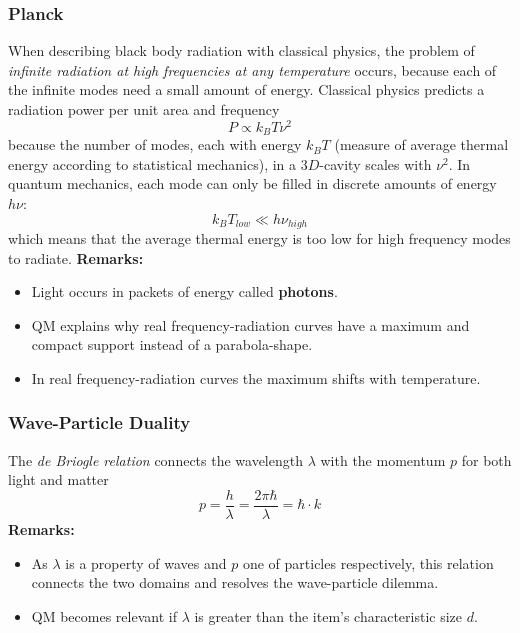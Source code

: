 \subsubsection{Planck}
When describing black body radiation with classical physics, the problem of \textit{infinite radiation at
    high frequencies at any temperature} occurs, because each of the infinite modes need a small amount of energy.
Classical physics predicts a radiation power per unit area and frequency 
\begin{equation*}
    P \propto k_B T \nu^2
\end{equation*}
because the number of modes, each with energy $k_B T$ (measure of average thermal energy according to statistical mechanics), in a $3D$-cavity scales with $\nu^2$.
In quantum mechanics, each mode can only be filled in discrete amounts of energy $h \nu$:
\begin{equation*}
    k_B T_{low} \ll h\nu_{high}
\end{equation*}
which means that the average thermal energy is too low for high frequency modes to radiate.
\newpar{}
\textbf{Remarks:}
\begin{itemize}
    \item Light occurs in packets of energy called \textbf{photons}.
    \item QM explains why real frequency-radiation curves have a maximum and compact support instead of a parabola-shape.
    \item In real frequency-radiation curves the maximum shifts with temperature.
\end{itemize}

\subsubsection{Wave-Particle Duality}
The \textit{de Briogle relation} connects the wavelength $\lambda$ with the momentum $p$ for both light and matter
\begin{equation*}
    p=\frac{h}{\lambda}=\frac{2\pi\hbar}{\lambda}=\hbar\cdot k
\end{equation*}
\textbf{Remarks:}
\begin{itemize}
    \item As $\lambda$ is a property of waves and $p$ one of particles respectively, this relation connects the two domains and resolves the wave-particle dilemma.
    \item QM becomes relevant if $\lambda$ is greater than the item's characteristic size $d$.
\end{itemize}

